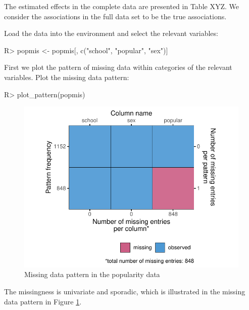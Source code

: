 \documentclass[
]{jss}
\begin{document}
The estimated effects in the complete data are presented in Table XYZ.
We consider the associations in the full data set to be the true
associations.

Load the data into the environment and select the relevant variables:

\begin{CodeChunk}
\begin{CodeInput}
R> popmis <- popmis[, c("school", "popular", "sex")] 
\end{CodeInput}
\end{CodeChunk}

First we plot the pattern of missing data within categories of the
relevant variables. Plot the missing data pattern:

\begin{CodeChunk}
\begin{CodeInput}
R> plot_pattern(popmis)
\end{CodeInput}
\begin{figure}

{\centering \includegraphics{Imputation_of_Incomplete_Multilevel_Data_files/figure-latex/pop_pat-1} 

}

\caption[Missing data pattern in the popularity data]{Missing data pattern in the popularity data}\label{fig:pop_pat}
\end{figure}
\end{CodeChunk}

The missingness is univariate and sporadic, which is illustrated in the
missing data pattern in Figure \ref{fig:pop_pat}.
\end{document}
